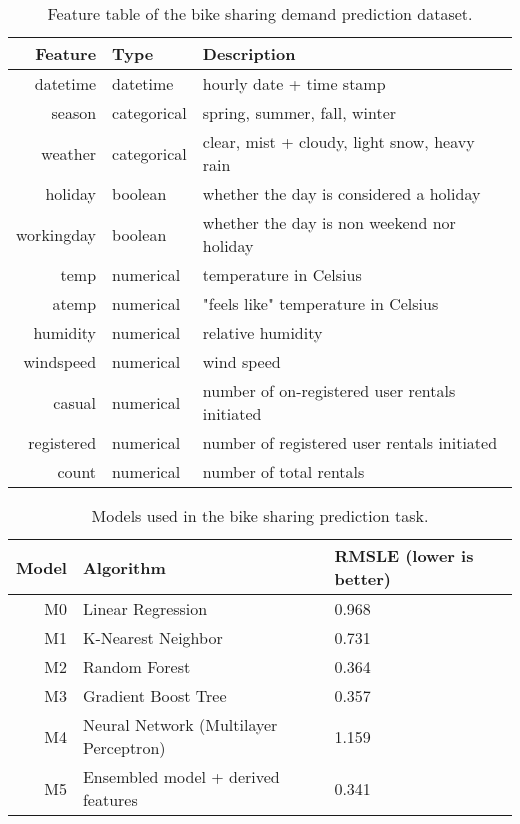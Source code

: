 \documentclass[preprint,journal]{vgtc}       %
\begin{document}
\begin{table}
  \small\sf
  \centering
  \vspace{2mm}
  \begin{tabular}{r|l|l}
    \toprule
    Feature    & Type        & Description \\
    \midrule
    datetime   & datetime    & hourly date + time stamp \\
    season     & categorical & spring, summer, fall, winter \\
    weather    & categorical & clear, mist + cloudy, light snow, heavy rain \\
    holiday    & boolean     & whether the day is considered a holiday \\
    workingday & boolean     & whether the day is non weekend nor holiday \\
    temp       & numerical   & temperature in Celsius \\
    atemp      & numerical   & "feels like" temperature in Celsius \\
    humidity   & numerical   & relative humidity \\
    windspeed  & numerical   & wind speed \\
    casual     & numerical   & number of on-registered user rentals initiated \\
    registered & numerical   & number of registered user rentals initiated \\
    count      & numerical   & number of total rentals \\
    \bottomrule
  \end{tabular}
  \vspace{1mm}
  \caption{Feature table of the bike sharing demand prediction dataset.}
  \label{table:regression-features}
\end{table}

\begin{table}
  \small\sf
  \centering
  \vspace{2mm}
  \begin{tabular}{r|l|l}
    \toprule
    Model & Algorithm & RMSLE (lower is better) \\
    \midrule
    M0 & Linear Regression & 0.968 \\
    M1 & K-Nearest Neighbor & 0.731 \\
    M2 & Random Forest & 0.364 \\
    M3 & Gradient Boost Tree & 0.357 \\
    M4 & Neural Network (Multilayer Perceptron) & 1.159 \\
    \midrule
    M5 & Ensembled model + derived features & 0.341 \\
    \bottomrule
  \end{tabular}
  \vspace{0.2mm}
  \caption{Models used in the bike sharing prediction task.}
  \label{table:regression-models}
  \vspace{-2mm}
\end{table}
\end{document}
